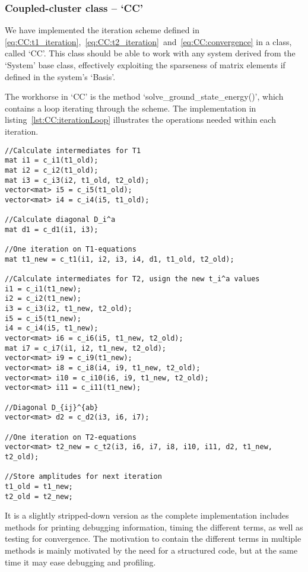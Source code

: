 \subsubsection{Coupled-cluster class -- `CC'}
We have implemented the iteration scheme defined in \eqref{eq:CC:t1_iteration},~\eqref{eq:CC:t2_iteration}~and~\eqref{eq:CC:convergence} in a class, called `CC'.
This class should be able to work with any system derived from the `System' base class, effectively exploiting the sparseness of matrix elements if defined in the system's `Basis'.

The workhorse in `CC' is the method `solve\_ground\_state\_energy()', which contains a loop iterating through the scheme.
The implementation in listing~\ref{lst:CC:iterationLoop} illustrates the operations needed within each iteration.
\begin{lstlisting}[float,label=lst:CC:iterationLoop,caption=The main content of the iteration loop in CC::solve\_ground\_state\_energy().]
//Calculate intermediates for T1
mat i1 = c_i1(t1_old);
mat i2 = c_i2(t1_old);
mat i3 = c_i3(i2, t1_old, t2_old);
vector<mat> i5 = c_i5(t1_old);
vector<mat> i4 = c_i4(i5, t1_old);

//Calculate diagonal D_i^a
mat d1 = c_d1(i1, i3);

//One iteration on T1-equations
mat t1_new = c_t1(i1, i2, i3, i4, d1, t1_old, t2_old);

//Calculate intermediates for T2, usign the new t_i^a values
i1 = c_i1(t1_new);
i2 = c_i2(t1_new);
i3 = c_i3(i2, t1_new, t2_old);
i5 = c_i5(t1_new);
i4 = c_i4(i5, t1_new);
vector<mat> i6 = c_i6(i5, t1_new, t2_old);
mat i7 = c_i7(i1, i2, t1_new, t2_old);
vector<mat> i9 = c_i9(t1_new);
vector<mat> i8 = c_i8(i4, i9, t1_new, t2_old);
vector<mat> i10 = c_i10(i6, i9, t1_new, t2_old);
vector<mat> i11 = c_i11(t1_new);

//Diagonal D_{ij}^{ab}
vector<mat> d2 = c_d2(i3, i6, i7);

//One iteration on T2-equations
vector<mat> t2_new = c_t2(i3, i6, i7, i8, i10, i11, d2, t1_new, t2_old);

//Store amplitudes for next iteration
t1_old = t1_new;
t2_old = t2_new;
\end{lstlisting}
It is a slightly stripped-down version as the complete implementation includes methods for printing debugging information, timing the different terms, as well as testing for convergence.
The motivation to contain the different terms in multiple methods is mainly motivated by the need for a structured code, but at the same time it may ease debugging and profiling.
